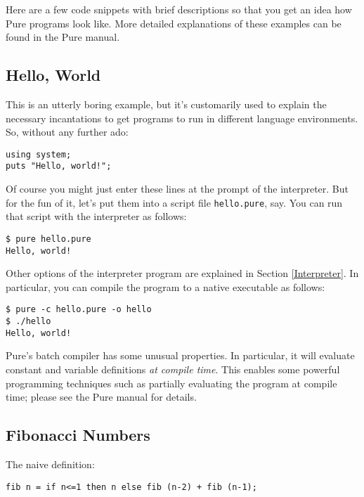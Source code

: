 \documentclass[a4paper,12pt]{article}
\begin{document}
Here are a few code snippets with brief descriptions so that you get an idea
how Pure programs look like. More detailed explanations of these examples can
be found in the Pure manual.

\subsection{Hello, World}

This is an utterly boring example, but it's customarily used to explain the
necessary incantations to get programs to run in different language
environments. So, without any further ado:

\begin{lstlisting}
using system;
puts "Hello, world!";
\end{lstlisting}

Of course you might just enter these lines at the prompt of the interpreter. But for the fun of it, let's put them into a script file \texttt{hello.pure}, say. You can run that script with the interpreter as follows:

\begin{verbatim}
$ pure hello.pure
Hello, world!
\end{verbatim}

Other options of the interpreter program are explained in Section \ref{Interpreter}. In particular, you can compile the program to a native executable as follows:

\begin{verbatim}
$ pure -c hello.pure -o hello
$ ./hello
Hello, world!
\end{verbatim}

Pure's batch compiler has some unusual properties. In particular, it will evaluate constant and variable definitions \emph{at compile time}. This enables some powerful programming techniques such as partially evaluating the program at compile time; please see the Pure manual for details.

\subsection{Fibonacci Numbers}
\label{Fibonacci}

The naive definition:

\begin{lstlisting}
fib n = if n<=1 then n else fib (n-2) + fib (n-1);
\end{lstlisting}
\end{document}
